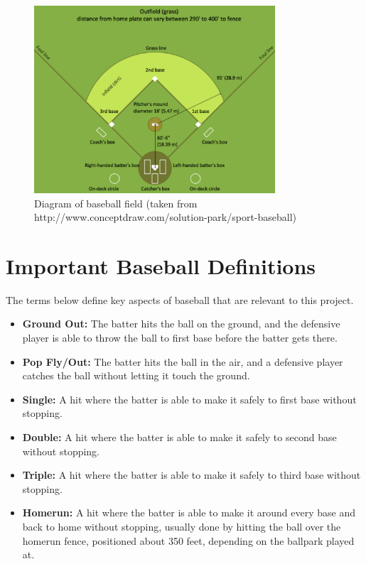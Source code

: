 \documentclass[
  letterpaper,
  DIV=11,
  numbers=noendperiod]{scrartcl}
\providecommand{\tightlist}{%
  \setlength{\itemsep}{0pt}\setlength{\parskip}{0pt}}\usepackage{longtable,booktabs,array}
\begin{document}
\begin{figure}[H]

{\centering \includegraphics[width=0.8\textwidth,height=0.8\textheight]{baseball.png}

}

\caption{Diagram of baseball field (taken from
http://www.conceptdraw.com/solution-park/sport-baseball)}

\end{figure}%

\section{Important Baseball
Definitions}\label{important-baseball-definitions}

The terms below define key aspects of baseball that are relevant to this
project.

\begin{itemize}
\tightlist
\item
  \textbf{Ground Out:} The batter hits the ball on the ground, and the
  defensive player is able to throw the ball to first base before the
  batter gets there.
\item
  \textbf{Pop Fly/Out:} The batter hits the ball in the air, and a
  defensive player catches the ball without letting it touch the ground.
\item
  \textbf{Single:} A hit where the batter is able to make it safely to
  first base without stopping.
\item
  \textbf{Double:} A hit where the batter is able to make it safely to
  second base without stopping.
\item
  \textbf{Triple:} A hit where the batter is able to make it safely to
  third base without stopping.
\item
  \textbf{Homerun:} A hit where the batter is able to make it around
  every base and back to home without stopping, usually done by hitting
  the ball over the homerun fence, positioned about 350 feet, depending
  on the ballpark played at.
\end{itemize}
\end{document}
